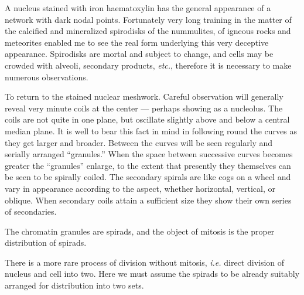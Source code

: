 \documentclass[a4paper, 12pt, oneside, landscape]{article}
\begin{document}
A nucleus stained with iron haematoxylin has the general appearance of a network with dark nodal points. Fortunately very long training in the matter of the calcified and mineralized spirodisks of the nummulites, of igneous rocks and meteorites enabled me to see the real form underlying this very deceptive appearance. Spirodisks are mortal and subject to change, and cells may be crowded with alveoli, secondary products, \emph{etc.}, therefore it is necessary to make numerous observations.

To return to the stained nuclear meshwork. Careful observation will generally reveal very minute coils at the center --- perhaps showing as a nucleolus. The coils are not quite in one plane, but oscillate slightly above and below a central median plane. It is well to bear this fact in mind in following round the curves as they get larger and broader. Between the curves will be seen regularly and serially arranged ``granules.'' When the space between successive curves becomes greater the ``granules'' enlarge, to the extent that presently they themselves can be seen to be spirally coiled. The secondary spirals are like cogs on a wheel and vary in appearance according to the aspect, whether horizontal, vertical, or oblique. When secondary coils attain a sufficient size they show their own series of secondaries.

The chromatin granules are spirads, and the object of mitosis is the proper distribution of spirads.

There is a more rare process of division without mitosis, \emph{i.e.} direct division of nucleus and cell into two. Here we must assume the spirads to be already suitably arranged for distribution into two sets.
\end{document}
